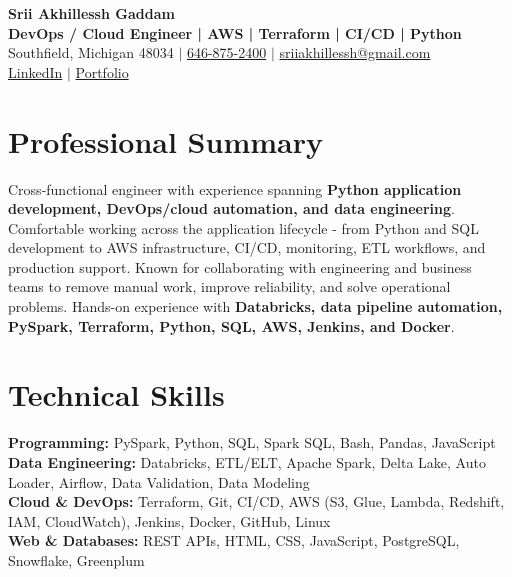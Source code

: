 \documentclass[letterpaper,10pt]{article}
\begin{document}
\fontsize{9.35pt}{10.45pt}\selectfont

\begin{center}
    {\LARGE \textbf{Srii Akhillessh Gaddam}} \\[-1pt]
    \textbf{DevOps / Cloud Engineer | AWS | Terraform | CI/CD | Python} \\[2pt]
    Southfield, Michigan 48034 $|$
    \href{tel:6468752400}{646-875-2400} $|$
    \href{mailto:sriiakhillessh@gmail.com}{sriiakhillessh@gmail.com} \\[1pt]
    \href{https://www.linkedin.com/in/srii-akhiilessh-gaddam-b48668191/}{LinkedIn} $|$
    \href{https://sriiakhillesshg.github.io/portfolio/}{Portfolio}
\end{center}
\vspace{-8pt}

\section{Professional Summary}
\small{Cross-functional engineer with experience spanning \textbf{Python application development, DevOps/cloud automation, and data engineering}. Comfortable working across the application lifecycle - from Python and SQL development to AWS infrastructure, CI/CD, monitoring, ETL workflows, and production support. Known for collaborating with engineering and business teams to remove manual work, improve reliability, and solve operational problems. Hands-on experience with \textbf{Databricks, data pipeline automation, PySpark, Terraform, Python, SQL, AWS, Jenkins, and Docker}.}

\section{Technical Skills}
\small{
\textbf{Programming:} PySpark, Python, SQL, Spark SQL, Bash, Pandas, JavaScript \\
\textbf{Data Engineering:} Databricks, ETL/ELT, Apache Spark, Delta Lake, Auto Loader, Airflow, Data Validation, Data Modeling \\
\textbf{Cloud \& DevOps:} Terraform, Git, CI/CD, AWS (S3, Glue, Lambda, Redshift, IAM, CloudWatch), Jenkins, Docker, GitHub, Linux \\
\textbf{Web \& Databases:} REST APIs, HTML, CSS, JavaScript, PostgreSQL, Snowflake, Greenplum
}
\end{document}
